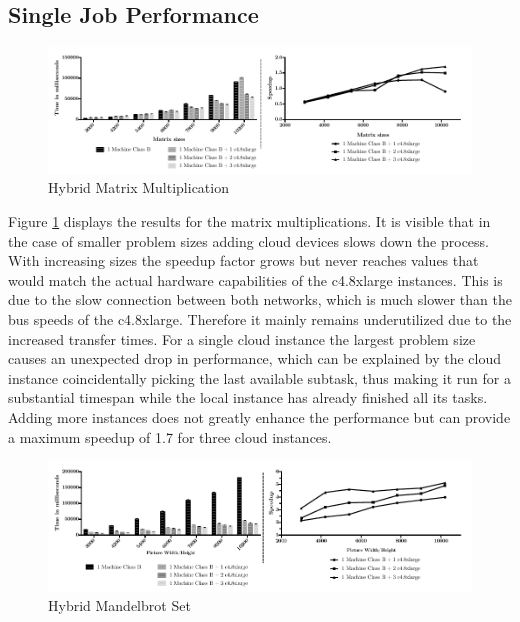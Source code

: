 \subsection*{Single Job Performance}

\begin{figure}[H]
	\includegraphics[width=1.0\textwidth]{images/hybrid_matrix_multiplication.pdf}
	\centering
	\caption{Hybrid Matrix Multiplication}
	\label{img:hybrid_matrix_multiplication}
\end{figure}

Figure \ref{img:hybrid_matrix_multiplication} displays the results for the matrix multiplications. It is visible that in the case of smaller problem sizes adding cloud devices slows down the process. With increasing sizes the speedup factor grows but never reaches values that would match the actual hardware capabilities of the c4.8xlarge instances. This is due to the slow connection between both networks, which is much slower than the bus speeds of the c4.8xlarge. Therefore it mainly remains underutilized due to the increased transfer times. For a single cloud instance the largest problem size causes an unexpected drop in performance, which can be explained by the cloud instance coincidentally picking the last available subtask, thus making it run for a substantial timespan while the local instance has already finished all its tasks. Adding more instances does not greatly enhance the performance but can provide a maximum speedup of 1.7 for three cloud instances.


\begin{figure}[H]	
	\includegraphics[width=1.0\textwidth]{images/hybrid_mandelbrot_performance.pdf}
	\centering
	\caption{Hybrid Mandelbrot Set}
	\label{img:hybrid_mandelbrot}
\end{figure}

